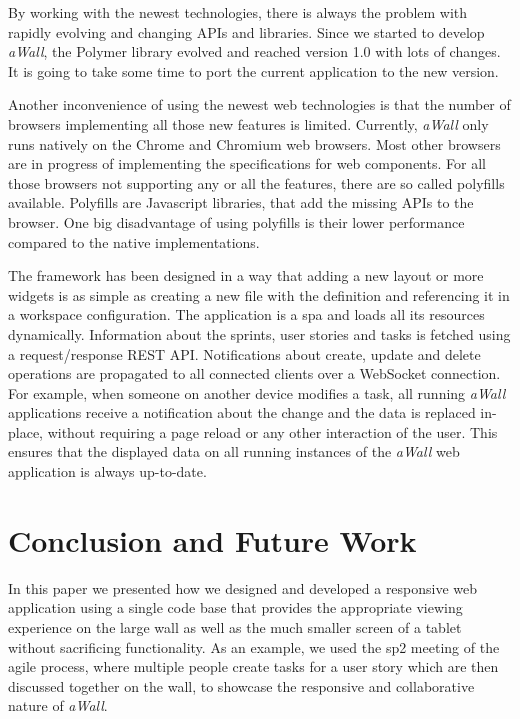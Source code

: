 \documentclass{sigchi}
\begin{document}
By working with the newest technologies, there is always the problem with rapidly evolving and changing APIs and libraries.
Since we started to develop \textit{aWall}, the Polymer library evolved and reached version 1.0 with lots of changes.
It is going to take some time to port the current application to the new version. 

Another inconvenience of using the newest web technologies is that the number of browsers implementing all those new features is limited.
Currently, \textit{aWall} only runs natively on the Chrome and Chromium web browsers.
Most other browsers are in progress of implementing the specifications for web components.
For all those browsers not supporting any or all the features, there are so called polyfills available.
Polyfills are Javascript libraries, that add the missing APIs to the browser.
One big disadvantage of using polyfills is their lower performance compared to the native implementations.


The framework has been designed in a way that adding a new layout or more widgets is as simple as creating a new file with the definition and referencing it in a workspace configuration.
The application is a \gls{spa} and loads all its resources dynamically.
Information about the sprints, user stories and tasks is fetched using a request/response REST API.
Notifications about create, update and delete operations are propagated to all connected clients over a WebSocket connection. 
For example, when someone on another device modifies a task, all running \textit{aWall} applications receive a notification about the change and the data is replaced in-place, without requiring a page reload or any other interaction of the user.
This ensures that the displayed data on all running instances of the \textit{aWall} web application is always up-to-date.

\section{Conclusion and Future Work}
In this paper we presented how we designed and developed a responsive web application using a single code base that provides the appropriate viewing experience on the large wall as well as the much smaller screen of a tablet without sacrificing functionality.
As an example, we used the \gls{sp2} meeting of the agile process, where multiple people create tasks for a user story which are then discussed together on the wall, to showcase the responsive and collaborative nature of \textit{aWall}.
\end{document}
